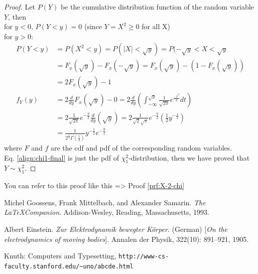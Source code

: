\documentclass[10pt, a4paper, oneside]{book}
\begin{document}
\begin{proof}\label{prf:X-2-chi}
Let $P(Y)$ be the cumulative distribution function of the random variable $Y$, then \\
for $y < 0$, $P(Y < y) = 0$ (since $Y = X^{2} \geq 0$ for all X) \\
for $y > 0$:
\begin{align}
P(Y < y) &= P(X^{2} < y) = P(|X| < \sqrt{y}) = P(-\sqrt{y} < X < \sqrt{y} \nonumber \\
         &= F_{x}(\sqrt{y}) - F_{x}(-\sqrt{y}) = F_{x}(\sqrt{y}) - (1 - F_{x}(\sqrt{y})) \nonumber \\
         & = 2F_{x}(\sqrt{y}) - 1 \nonumber \\
f_{Y}(y) &= 2\frac{d}{dy}F_{x}(\sqrt{y}) - 0 = 2\frac{d}{dy}(\int^{\sqrt{y}}_{-\infty}\frac{1}{\sqrt{2\pi}}e^{\frac{-t^{2}}{2}}dt) \nonumber \\
         &= 2\frac{1}{\sqrt{2\pi}}e^{-\frac{y}{2}}\frac{d}{dy}(\sqrt{y}) = 2\frac{1}{\sqrt{2}\sqrt{\pi}}e^{-\frac{y}{2}}(\frac{1}{2}y^{-\frac{1}{2}}) \nonumber \\
         &= \frac{1}{2^{\frac{1}{2}}\Gamma(\frac{1}{2})}y^{-\frac{1}{2}}e^{-\frac{y}{2}} \label{align:chi1-final}
\end{align}
where $F$ and $f$ are the cdf and pdf of the corresponding random variables. \\
Eq. \ref{align:chi1-final} is just the pdf of $\chi^{2}_{1}$-distribution, then we have proved that $Y  \sim \chi^{2}_{1}$.
\end{proof}

You can refer to this proof like this =\textgreater{} Proof \ref{prf:X-2-chi}

\renewcommand\bibname{Bibliography}
\begin{thebibliography}{9}\label{thebibliography}

Michel Goossens, Frank Mittelbach, and Alexander Samarin. \emph{The \LaTeX Companion}. Addison-Wesley, Reading, Massachusetts, 1993.

Albert Einstein. \emph{Zur Elektrodynamik bewegter Körper}. (German) {[}\emph{On the electrodynamics of moving bodies}{]}. Annalen der Physik, 322(10): 891--921, 1905.

Knuth: Computers and Typesetting, \newline \texttt{http://www-cs-faculty.stanford.edu/\textasciitilde{}uno/abcde.html}

\end{thebibliography}

\printindex
\end{document}
